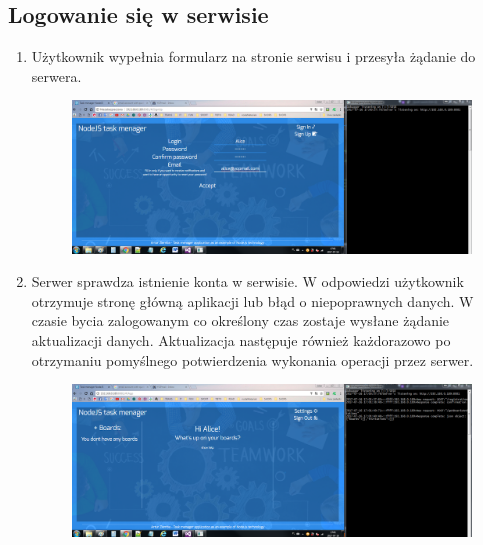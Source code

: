 \documentclass[12pt]{report}
\begin{document}
\begin{enumerate}
\begin{enumerate}
\subsection{Logowanie się w serwisie}
\begin{enumerate}
\item Użytkownik wypełnia formularz na stronie serwisu i przesyła żądanie do serwera.
\begin{figure}[!t]
\centering
\includegraphics{41.png}
\end{figure}
\item Serwer sprawdza istnienie konta w serwisie. 
W odpowiedzi użytkownik otrzymuje stronę główną aplikacji lub błąd o niepoprawnych danych.
W czasie bycia zalogowanym co określony czas zostaje wysłane żądanie aktualizacji danych. 
Aktualizacja następuje również każdorazowo po otrzymaniu pomyślnego potwierdzenia wykonania operacji przez serwer.
\begin{figure}[!t]
\centering
\includegraphics{42.png}
\end{figure}
\end{enumerate}


\end{enumerate}
\end{enumerate}
\end{document}
